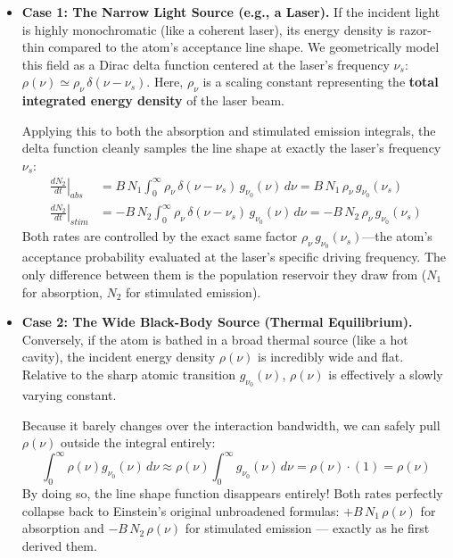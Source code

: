 \begin{itemize}
    \item \textbf{Case 1: The Narrow Light Source (e.g., a Laser).}
          If the incident light is highly monochromatic (like a coherent laser), its energy density is razor-thin compared to the atom's acceptance line shape. We geometrically model this field as a Dirac delta function centered at the laser's frequency $\nu_s$: $\rho(\nu) \simeq \rho_\nu\,\delta(\nu - \nu_s)$. Here, $\rho_\nu$ is a scaling constant representing the \textbf{total integrated energy density} of the laser beam.

          Applying this to both the absorption and stimulated emission integrals, the delta function cleanly samples the line shape at exactly the laser's frequency $\nu_s$:
          \begin{align*}
              \left.\frac{dN_2}{dt}\right|_{abs}  & = B\,N_1 \int_0^\infty \rho_\nu\,\delta(\nu - \nu_s)\, g_{\nu_0}(\nu)\,d\nu = B\,N_1\,\rho_\nu\, g_{\nu_0}(\nu_s)   \\[8pt]
              \left.\frac{dN_2}{dt}\right|_{stim} & = -B\,N_2 \int_0^\infty \rho_\nu\,\delta(\nu - \nu_s)\, g_{\nu_0}(\nu)\,d\nu = -B\,N_2\,\rho_\nu\, g_{\nu_0}(\nu_s)
          \end{align*}
          Both rates are controlled by the exact same factor $\rho_\nu\,g_{\nu_0}(\nu_s)$—the atom's acceptance probability evaluated at the laser's specific driving frequency. The only difference between them is the population reservoir they draw from ($N_1$ for absorption, $N_2$ for stimulated emission).

    \item \textbf{Case 2: The Wide Black-Body Source (Thermal Equilibrium).}
          Conversely, if the atom is bathed in a broad thermal source (like a hot cavity), the incident energy density $\rho(\nu)$ is incredibly wide and flat. Relative to the sharp atomic transition $g_{\nu_0}(\nu)$, $\rho(\nu)$ is effectively a slowly varying constant.

          Because it barely changes over the interaction bandwidth, we can safely pull $\rho(\nu)$ outside the integral entirely:
          \begin{equation*}
              \int_0^\infty \rho(\nu) g_{\nu_0}(\nu)\,d\nu \approx \rho(\nu) \int_0^\infty g_{\nu_0}(\nu)\,d\nu = \rho(\nu) \cdot (1) = \rho(\nu)
          \end{equation*}
          By doing so, the line shape function disappears entirely! Both rates perfectly collapse back to Einstein's original unbroadened formulas: $+B\,N_1\,\rho(\nu)$ for absorption and $-B\,N_2\,\rho(\nu)$ for stimulated emission — exactly as he first derived them.
\end{itemize}

